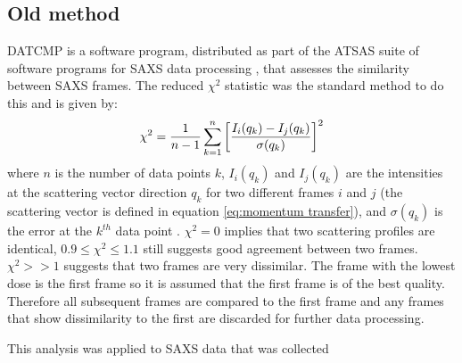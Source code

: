 \subsection{Old method}
\label{sub:Old method}
DATCMP is a software program, distributed as part of the ATSAS suite of software programs for SAXS data processing \cite{petoukhov2012new}, that assesses the similarity between SAXS frames.
The reduced $\chi^2$ statistic \cite{pearson1900x} was the standard method to do this and is given by:
\begin{equation}
    \chi^2 = \frac{1}{n-1} \sum_{k=1}^{n}\left[ \frac{I_i(q_k) - I_j(q_k)}{\sigma(q_k)}\right]^2
\end{equation}
where $n$ is the number of data points $k$, $I_i(q_k)$ and $I_j(q_k)$ are the intensities at the scattering vector direction $q_k$ for two different frames $i$ and $j$ (the scattering vector is defined in equation \ref{eq:momentum transfer}), and $\sigma(q_k)$ is the error at the $k^{th}$ data point \cite{franke2015synchrotron}.
$\chi^2 = 0$ implies that two scattering profiles are identical, $0.9 \le \chi^2 \le 1.1$ still suggests good agreement between two frames.
$\chi^2 >> 1$ suggests that two frames are very dissimilar.
The frame with the lowest dose is the first frame so it is assumed that the first frame is of the best quality.
Therefore all subsequent frames are compared to the first frame and any frames that show dissimilarity to the first are discarded for further data processing.

This analysis was applied to SAXS data that was collected
